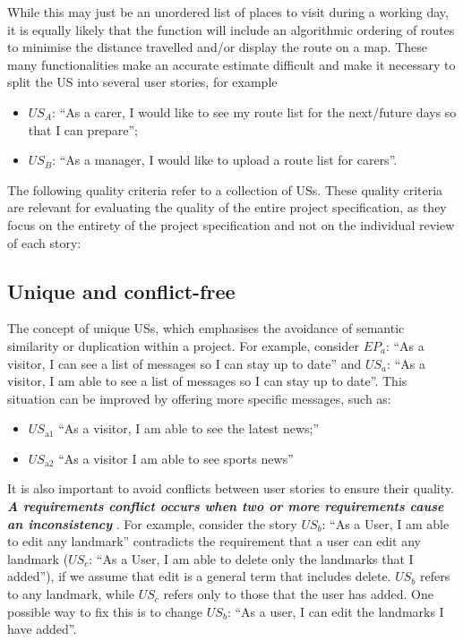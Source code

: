 While this may just be an unordered list of places to visit during a working day, it is equally likely that the function will include an algorithmic ordering of routes to minimise the distance travelled and/or display the route on a map. These many functionalities make an accurate estimate difficult and make it necessary to split the US into several user stories, for example
\begin{itemize}
\item $US_A$: \enquote{As a carer, I would like to see my route list for the next/future days so that I can prepare};
\item $US_B$: \enquote{As a manager, I would like to upload a route list for carers}.
\end{itemize}

The following quality criteria refer to a collection of USs. These quality criteria are relevant for evaluating the quality of the entire project specification, as they focus on the entirety of the project specification and not on the individual review of each story:
\subsection*{\normalsize{Unique and conflict-free}}
The concept of unique USs, which emphasises the avoidance of semantic similarity or duplication within a project. For example, consider $EP_a$: \enquote{As a visitor, I can see a list of messages so I can stay up to date} and $US_a$: \enquote{As a visitor, I am able to see a list of messages so I can stay up to date}. This situation can be improved by offering more specific messages, such as:
\begin{itemize}
\item $US_{\text{a1}}$ \enquote{As a visitor, I am able to see the latest news;}
\item $US_{\text{a2}}$ \enquote{As a visitor I am able to see sports news}
\end{itemize}
It is also important to avoid conflicts between user stories to ensure their quality. \textbf{\emph{A requirements conflict occurs when two or more requirements cause an inconsistency}} \cite{paja2013managing} \cite{robinson1989integrating}. For example, consider the story $US_b$: \enquote{As a User, I am able to edit any landmark} contradicts the requirement that a user can edit any landmark ($US_c$: \enquote{As a User, I am able to delete only the landmarks that I added}), if we assume that edit is a general term that includes delete. $US_b$ refers to any landmark, while $US_c$ refers only to those that the user has added. One possible way to fix this is to change $US_b$: \enquote{As a user, I can edit the landmarks I have added}. \cite{lucassen2016improving}

